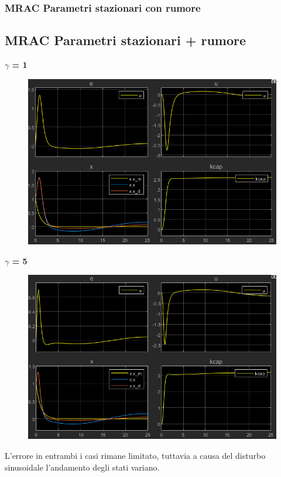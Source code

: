 \documentclass{beamer}
\begin{document}
\begin{frame}
	\frametitle{MRAC Parametri stazionari con rumore}
	\subsection{MRAC Parametri stazionari + rumore}
	\begin{minipage}[t]{0.45\textwidth}
		\textbf{\(\gamma \) = 1}
		\begin{figure}
			\includegraphics[scale=0.25]{2022-05-20-11-03-08.png} %
		\end{figure}
	\end{minipage}
	\begin{minipage}[t]{0.45\textwidth}
		\textbf{\(\gamma \) = 5}
		\begin{figure}
			\includegraphics[scale=0.25]{2022-05-20-11-04-01.png} %
		\end{figure}
	\end{minipage}
	\vspace{0.1cm}
	L'errore in entrambi i casi rimane limitato, tuttavia a causa del disturbo sinusoidale l'andamento degli stati variano.
\end{frame}
\end{document}
